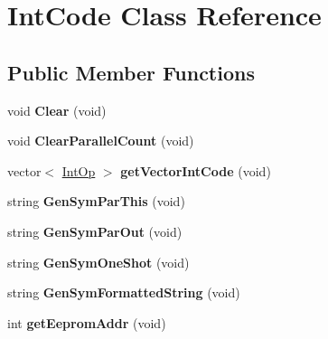 \hypertarget{class_int_code}{\section{Int\-Code Class Reference}
\label{class_int_code}
}
\subsection*{Public Member Functions}
\begin{DoxyCompactItemize}
\item 
\hypertarget{class_int_code_a4fc3a7adfbcd7f2c06f3fa7fae990cae}{void {\bfseries Clear} (void)}\label{class_int_code_a4fc3a7adfbcd7f2c06f3fa7fae990cae}

\item 
\hypertarget{class_int_code_ae53945a620ab3d8e6f0db326a004efbe}{void {\bfseries Clear\-Parallel\-Count} (void)}\label{class_int_code_ae53945a620ab3d8e6f0db326a004efbe}

\item 
\hypertarget{class_int_code_a0d52b4b3dbd1df8ee96dfaffe5969ee7}{vector$<$ \hyperlink{struct_int_op_tag}{Int\-Op} $>$ {\bfseries get\-Vector\-Int\-Code} (void)}\label{class_int_code_a0d52b4b3dbd1df8ee96dfaffe5969ee7}

\item 
\hypertarget{class_int_code_a3de4afb7433741415b79185b63d2675c}{string {\bfseries Gen\-Sym\-Par\-This} (void)}\label{class_int_code_a3de4afb7433741415b79185b63d2675c}

\item 
\hypertarget{class_int_code_a86885d599550db8bf8dcdc48fd2ace37}{string {\bfseries Gen\-Sym\-Par\-Out} (void)}\label{class_int_code_a86885d599550db8bf8dcdc48fd2ace37}

\item 
\hypertarget{class_int_code_a6357a4a7e96c2795f00381f17282550c}{string {\bfseries Gen\-Sym\-One\-Shot} (void)}\label{class_int_code_a6357a4a7e96c2795f00381f17282550c}

\item 
\hypertarget{class_int_code_aeb4ddb87f783e660a41f9959ce2e644e}{string {\bfseries Gen\-Sym\-Formatted\-String} (void)}\label{class_int_code_aeb4ddb87f783e660a41f9959ce2e644e}

\item 
\hypertarget{class_int_code_a59c316ce6cc15a0ccf71ff4bc0e91c08}{int {\bfseries get\-Eeprom\-Addr} (void)}\label{class_int_code_a59c316ce6cc15a0ccf71ff4bc0e91c08}


\end{DoxyCompactItemize}
